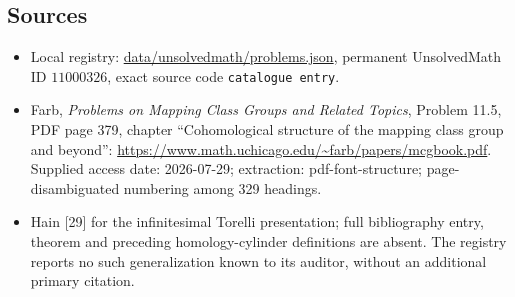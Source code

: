 \documentclass[11pt]{article}
\begin{document}
\subsection{Sources}
\begin{itemize}
\item Local registry: \url{data/unsolvedmath/problems.json}, permanent UnsolvedMath ID $11000326$, exact source code \texttt{catalogue entry}.
\item Farb, \emph{Problems on Mapping Class Groups and Related Topics}, Problem 11.5, PDF page 379, chapter ``Cohomological structure of the mapping class group and beyond'': \url{https://www.math.uchicago.edu/~farb/papers/mcgbook.pdf}. Supplied access date: 2026-07-29; extraction: pdf-font-structure; page-disambiguated numbering among 329 headings.
\item Hain [29] for the infinitesimal Torelli presentation; full bibliography entry, theorem and preceding homology-cylinder definitions are absent. The registry reports no such generalization known to its auditor, without an additional primary citation.
\end{itemize}
\end{document}
